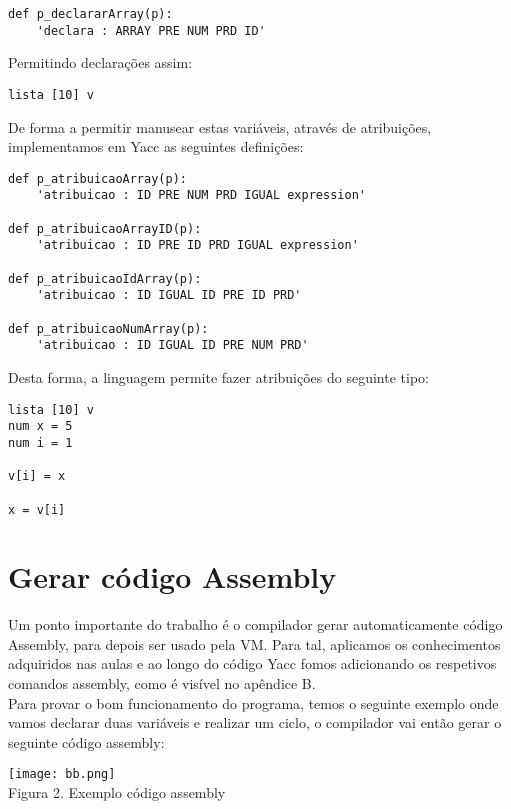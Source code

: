 \documentclass[11pt,a4paper]{report}%
\begin{document}
\begin{verbatim}
def p_declararArray(p): 
    'declara : ARRAY PRE NUM PRD ID'
\end{verbatim}

Permitindo declarações assim:
\\
\begin{lstlisting}[frame=single,numbers=none]
lista [10] v
\end{lstlisting}


De forma a permitir manusear estas variáveis, através de atribuições, implementamos em Yacc as seguintes definições:

\begin{verbatim}
def p_atribuicaoArray(p):
    'atribuicao : ID PRE NUM PRD IGUAL expression'

def p_atribuicaoArrayID(p):
    'atribuicao : ID PRE ID PRD IGUAL expression'

def p_atribuicaoIdArray(p):
    'atribuicao : ID IGUAL ID PRE ID PRD'

def p_atribuicaoNumArray(p):
    'atribuicao : ID IGUAL ID PRE NUM PRD'
\end{verbatim}

Desta forma, a linguagem permite fazer atribuições do seguinte tipo:
\\
\begin{lstlisting}[frame=single,numbers=none]
lista [10] v
num x = 5
num i = 1

v[i] = x 

x = v[i]
\end{lstlisting}


\chapter{Gerar código Assembly}

Um ponto importante do trabalho é o compilador gerar automaticamente código Assembly, para depois ser usado pela VM. Para tal, aplicamos os conhecimentos adquiridos nas aulas e ao longo do código Yacc fomos adicionando os respetivos comandos assembly, como é visível no apêndice B. 
\\
Para provar o bom funcionamento do programa, temos o seguinte exemplo onde vamos declarar duas variáveis e realizar um ciclo, o compilador vai então gerar o seguinte código assembly:

\begin{center}
    \texttt{[image: bb.png]}
    \\
    \caption{Figura 2. Exemplo código assembly}
\end{center}
\end{document}
